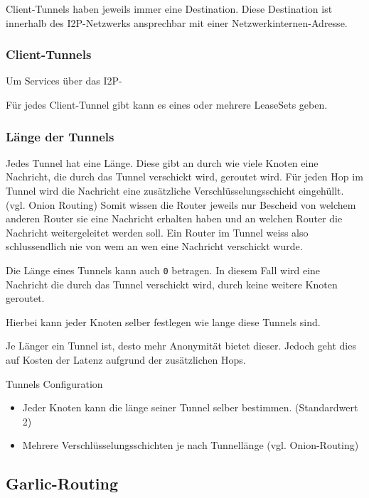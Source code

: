 Client-Tunnels haben jeweils immer eine Destination. Diese Destination ist innerhalb des I2P-Netzwerks ansprechbar mit einer Netzwerkinternen-Adresse.

\cite{de_boer_invisible_2019}

\subsubsection{Client-Tunnels}

Um Services über das I2P-

Für jedes Client-Tunnel gibt kann es eines oder mehrere LeaseSets geben.



\subsubsection{Länge der Tunnels}

Jedes Tunnel hat eine Länge.
Diese gibt an durch wie viele Knoten eine Nachricht, die durch das Tunnel verschickt wird, geroutet wird.
Für jeden Hop im Tunnel wird die Nachricht eine zusätzliche Verschlüsselungsschicht eingehüllt. (vgl. Onion Routing)
Somit wissen die Router jeweils nur Bescheid von welchem anderen Router sie eine Nachricht erhalten haben und an welchen Router die Nachricht weitergeleitet werden soll.
Ein Router im Tunnel weiss also schlussendlich nie von wem an wen eine Nachricht verschickt wurde.

Die Länge eines Tunnels kann auch \lstinline|0| betragen.
In diesem Fall wird eine Nachricht die durch das Tunnel verschickt wird, durch keine weitere Knoten geroutet.

Hierbei kann jeder Knoten selber festlegen wie lange diese Tunnels sind.

Je Länger ein Tunnel ist, desto mehr Anonymität bietet dieser.
Jedoch geht dies auf Kosten der Latenz aufgrund der zusätzlichen Hops.

Tunnels Configuration
\cite{noauthor_i2p_nodate-3}


\begin{itemize}
    \item Jeder Knoten kann die länge seiner Tunnel selber bestimmen. (Standardwert 2)
    \item Mehrere Verschlüsselungsschichten je nach Tunnellänge (vgl. Onion-Routing)
\end{itemize}

\subsection{Garlic-Routing}

